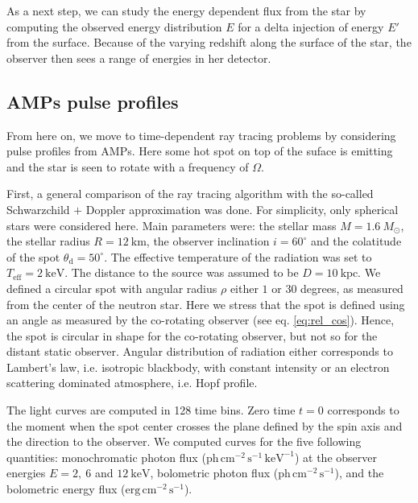 \documentclass[iop, usenatbib]{emulateapj}
\newcommand{\Msun}{\ensuremath{M_{\odot}}}
\begin{document}
As a next step, we can study the energy dependent flux from the star by computing the observed energy distribution $E$ for a delta injection of energy $E'$ from the surface.
Because of the varying redshift along the surface of the star, the observer then sees a range of energies in her detector.





\subsection{AMPs pulse profiles}

From here on, we move to time-dependent ray tracing problems by considering pulse profiles from AMPs.
Here some hot spot on top of the suface is emitting and the star is seen to rotate with a frequency of $\Omega$.



First, a general comparison of the ray tracing algorithm with the so-called Schwarzchild $+$ Doppler approximation \citep[see e.g.][]{PB06} was done.  
For simplicity, only spherical stars were considered here.
Main parameters were: the stellar mass $M = 1.6~\Msun$, the stellar radius $R = 12~\mathrm{km}$, the observer inclination $i = 60^{\circ}$ and the colatitude of the spot $\theta_{\mathrm{d}} = 50^{\circ}$.  
The effective temperature of the radiation was set to $T_{\mathrm{eff}} = 2~\mathrm{keV}$.  
The distance to the source was assumed to be $D = 10~\mathrm{kpc}$.  
We defined a circular spot with angular radius $\rho$ either $1$ or $30$ degrees, as measured from the center of the neutron star.  
Here we stress that the spot is defined using an angle as measured by the co-rotating observer (see eq.  \eqref{eq:rel_cos}).
Hence, the spot is circular in shape for the co-rotating observer, but not so for the distant static observer.
Angular distribution of radiation either corresponds to Lambert's law, i.e. isotropic blackbody, with constant intensity or an electron scattering dominated atmosphere, i.e. Hopf profile.


The light curves are computed in 128 time bins.  Zero time $t = 0$ corresponds to the moment when the spot center crosses the plane defined by the spin axis and the direction to the observer.  
We computed curves for the five following quantities: monochromatic photon flux ($\mathrm{ph}\,\mathrm{cm}^{-2}\,\mathrm{s}^{-1}\,\mathrm{keV}^{-1}$) at the observer energies $E = 2,~6$ and $12~\mathrm{keV}$, bolometric photon flux ($\mathrm{ph}\,\mathrm{cm}^{-2}\,\mathrm{s}^{-1}$), and the bolometric energy flux ($\mathrm{erg}\,\mathrm{cm}^{-2}\,\mathrm{s}^{-1}$).
\end{document}
